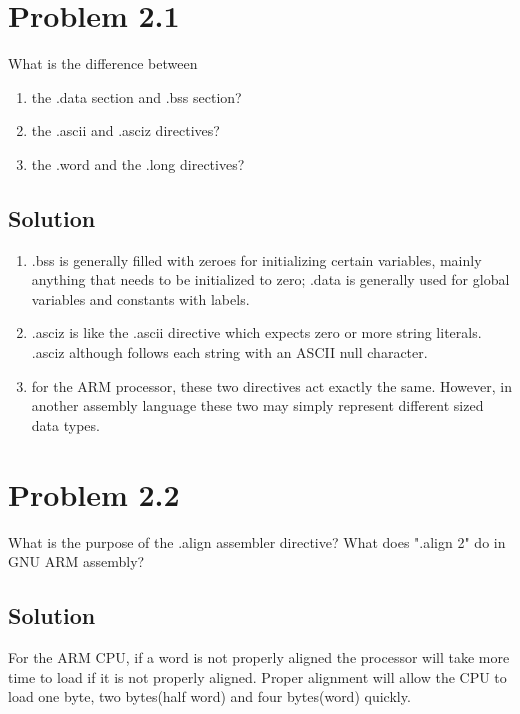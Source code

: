 \documentclass[letterpaper,11pt]{texMemo} %
\begin{document}
\maketitle %


\section*{Problem 2.1}
What is the difference between
\begin{enumerate}[label=\Alph*]
    \item the .data section and .bss section?
    \item the .ascii and .asciz directives?
    \item the .word and the .long directives?
\end{enumerate}
\subsection*{Solution}
\begin{enumerate}[label=\Alph*]
    \item .bss is generally filled with zeroes for initializing certain variables, mainly anything that needs to be initialized to zero;
        .data is generally used for global variables and constants with labels.
    \item .asciz is like the .ascii directive which expects zero or more string literals. .asciz although follows
        each string with an ASCII null character.
    \item for the ARM processor, these two directives act exactly the same. However, in another assembly language these two
        may simply represent different sized data types.
\end{enumerate}

\section*{Problem 2.2}
What is the purpose of the .align assembler directive? What does ".align 2" do in GNU ARM assembly?
\subsection*{Solution}
For the ARM CPU, if a word is not properly aligned the processor will take more time to load if it is not
properly aligned. Proper alignment will allow the CPU to load one byte, two bytes(half word) and four bytes(word)
quickly.
\end{document}
